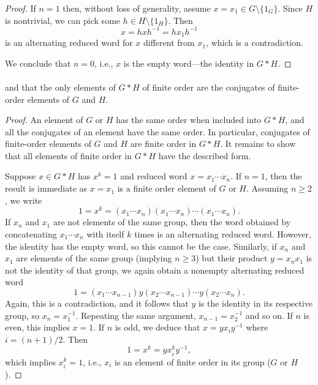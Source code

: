 \documentclass[12pt]{article}
\newlength{\myparskip}
\newenvironment{fullbox}{\begin{lrbox}{\savefullbox}\begin{minipage}{\dimexpr\textwidth-2\fboxsep\relax}\setlength{\parskip}{\myparskip}}{\end{minipage}\end{lrbox}\framebox[\textwidth]{\usebox{\savefullbox}}}
\newenvironment{pbox}[1][]{\begin{fullbox}\ifx#1\empty\else\paragraph{#1}\phantom{}\fi}{\end{fullbox}}
\theoremstyle{definition}
\newcommand{\<}{\langle}
\renewcommand{\>}{\rangle}
\begin{document}
\begin{proof}
    If $n = 1$ then, without loss of generality, assume $x = x_1 \in G \setminus \{1_G\}$.
    Since $H$ is nontrivial, we can pick some $h \in H \setminus\{1_H\}$.
    Then
    \[
        x = hxh^{-1} = hx_1h^{-1}
    \]
    is an alternating reduced word for $x$ different from $x_1$, which is a contradiction.

    We conclude that $n = 0$, i.e., $x$ is the empty word---the identity in $G * H$.
\end{proof}

\begin{pbox}
    and that the only elements of $G * H$ of finite order are the conjugates of finite-order elements of $G$ and $H$.
\end{pbox}

\begin{proof}
    An element of $G$ or $H$ has the same order when included into $G * H$, and all the conjugates of an element have the same order.
    In particular, conjugates of finite-order elements of $G$ and $H$ are finite order in $G * H$.
    It remains to show that all elements of finite order in $G * H$ have the described form.

    Suppose $x \in G * H$ has $x^k = 1$ and reduced word $x = x_1 \cdots x_n$.
    If $n = 1$, then the result is immediate as $x = x_1$ is a finite order element of $G$ or $H$.
    Assuming $n \geq 2$, we write
    \[
        1 = x^k = (x_1 \cdots x_n)(x_1 \cdots x_n) \cdots (x_1 \cdots x_n).
    \]
    If $x_n$ and $x_1$ are not elements of the same group, then the word obtained by concatenating $x_1 \cdots x_n$ with itself $k$ times is an alternating reduced word.
    However, the identity has the empty word, so this cannot be the case.
    Similarly, if $x_n$ and $x_1$ are elements of the same group (implying $n \geq 3$) but their product $y = x_n x_1$ is not the identity of that group, we again obtain a nonempty alternating reduced word
    \[
        1 = (x_1 \cdots x_{n-1})y(x_2 \cdots x_{n-1}) \cdots y(x_2 \cdots x_n).
    \]
    Again, this is a contradiction, and it follows that $y$ is the identity in its respective group, so $x_n = x_1^{-1}$.
    Repeating the same argument, $x_{n-1} = x_2^{-1}$ and so on.
    If $n$ is even, this implies $x = 1$.
    If $n$ is odd, we deduce that $x = yx_iy^{-1}$ where $i = (n+1)/2$.
    Then
    \[
        1 = x^k = yx_i^ky^{-1},
    \]
    which implies $x_i^k = 1$, i.e., $x_i$ is an element of finite order in its group ($G$ or $H$).
\end{proof}
\end{document}
